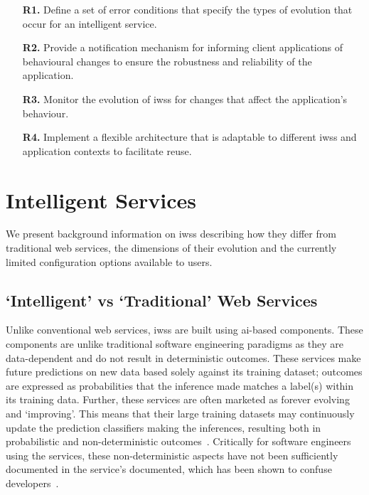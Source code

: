 \begin{itemize}
    \item [\textbf{R1.}] Define a set of error conditions that specify the types of evolution that occur for an intelligent service.
    \item [\textbf{R2.}] Provide a notification mechanism for informing client applications of behavioural changes to ensure the robustness and reliability of the application. 
    \item [\textbf{R3.}] Monitor the evolution of \glspl{iws} for changes that affect the application's behaviour. 
    \item [\textbf{R4.}] Implement a flexible architecture that is adaptable to different \glspl{iws} and application contexts to facilitate reuse. 
\end{itemize}

\section{Intelligent Services}
\label{sec:background}

We present background information on \glspl{iws} describing how they differ from traditional web services, the dimensions of their evolution and the currently limited configuration options available to users. 

\subsection{`Intelligent' vs `Traditional' Web Services}

Unlike conventional web services, \glspl{iws} are built using \gls{ai}-based components. These components are unlike traditional software engineering paradigms as they are data-dependent and do not result in deterministic outcomes. These services make future predictions on new data based solely against its training dataset; outcomes are expressed as probabilities that the inference made matches a label(s) within its training data. Further, these services are often marketed as forever evolving and `improving'. This means that their large training datasets may continuously update the prediction classifiers making the inferences, resulting both in probabilistic and non-deterministic outcomes~\citep{Cummaudo:2019icsme,Hosseini:2018jr}. Critically for software engineers using the services, these non-deterministic aspects have not been sufficiently documented in the service's  documented, which has been shown to confuse developers~\citep{Cummaudo:2020icse}.

